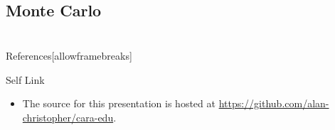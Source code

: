 \documentclass[pdf]{beamer}
\makeatletter
\def\beamer@writeslidentry@miniframesoff{%
  \expandafter\beamer@ifempty\expandafter{\beamer@framestartpage}{}%
  {%
    \clearpage\beamer@notesactions%
  }
}
\newcommand*{\miniframesoff}{\let\beamer@writeslidentry=\beamer@writeslidentry@miniframesoff}
\makeatother
\begin{document}
\subsection{Monte Carlo}

\miniframesoff
\section*{}
\begin{frame}{References}[allowframebreaks]
    \tiny
\end{frame}

\begin{frame}{Self Link}
  \begin{itemize}
  \item The source for this presentation is hosted at
    \url{https://github.com/alan-christopher/cara-edu}.
  \end{itemize}
\end{frame}
\end{document}
